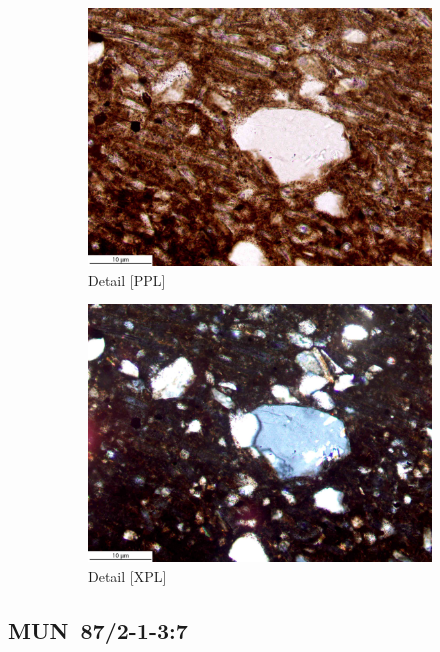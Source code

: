 \documentclass[a4paper]{article}
\begin{document}
\begin{figure}[H]
\begin{subfigure}[t]{.49\textwidth}
		\includegraphics[width=\textwidth]{ThinSections/102-2_20x_PPL.jpg}
		\caption{Detail [PPL]}
	\end{subfigure}\hspace{.5em}\hfill
	\begin{subfigure}[t]{.49\textwidth}
		\includegraphics[width=\textwidth]{ThinSections/102-2_20x_XPL.jpg}
		\caption{Detail [XPL]}
	\end{subfigure}
	\caption{}
	\label{fig:102_mun}
\end{figure}

\newpage\subsection{MUN~87/2-1-3:7 \citep[mun\#101; Fig.~\ref{fig:mun.pottery}.10; Pikunda-Munda style;][474 Pl.~93.1]{Seidensticker.2021e}}
\end{document}
